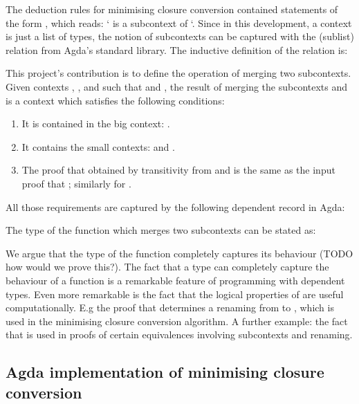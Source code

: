 \documentclass[bsc,frontabs,oneside,singlespacing,parskip,deptreport]{infthesis}
\theoremstyle{definition}
\begin{document}
The deduction rules for minimising closure conversion contained
statements of the form , which reads: ` is a
subcontext of `. Since in this development, a context is just a
list of types, the notion of subcontexts can be captured with the
 (sublist) relation from Agda's standard library. The
inductive definition of the relation is:


This project's contribution is to define the operation of merging two
subcontexts. Given contexts , , and  such that
 and , the result of merging the subcontexts
 and  is a context  which satisfies the following
conditions:

\begin{enumerate}
\item It is contained in the big context: .
\item It contains the small contexts:  and .
\item The proof that  obtained by transitivity from  and  is the same as the input proof that ; similarly for .
\end{enumerate}

All those requirements are captured by the following dependent record
in Agda:


The type of the function which merges two subcontexts can be stated
as:


We argue that the type of the function completely captures its
behaviour (TODO how would we prove this?). The fact that a type can
completely capture the behaviour of a function is a remarkable feature
of programming with dependent types. Even more remarkable is the fact
that the logical properties of  are useful computationally. E.g
the proof that  determines a renaming from  to
, which is used in the minimising closure conversion
algorithm. A further example: the fact that  is used in proofs of certain equivalences involving subcontexts
and renaming.

\subsection{Agda implementation of minimising closure conversion}
\label{sec:agda-impl-minim}
\end{document}
